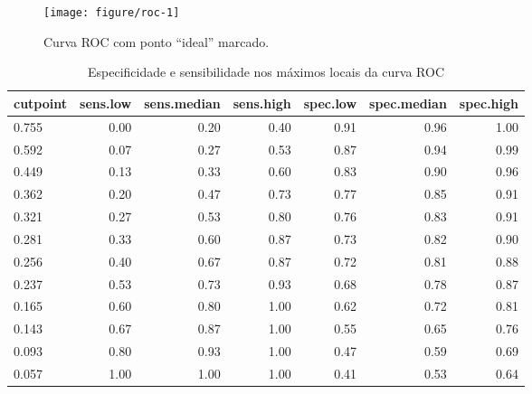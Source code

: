 \documentclass[a4paper,titlepage]{ppgi}\usepackage[]{graphicx}\usepackage[]{color}
\makeatletter
\def\maxwidth{ %
  \ifdim\Gin@nat@width>\linewidth
    \linewidth
  \else
    \Gin@nat@width
  \fi
}
\newenvironment{knitrout}{}{} %
\makeatother
\begin{document}
{\begin{knitrout}
\color{fgcolor}\begin{figure}
\texttt{[image: figure/roc-1]} \caption[Curva ROC com ponto ``ideal'' marcado]{Curva ROC com ponto ``ideal'' marcado.}\label{fig:roc}
\end{figure}


\end{knitrout}

\begin{table}
\centering
\begin{knitrout}
\color{fgcolor}
\begin{tabular}{l|r|r|r|r|r|r}
\hline
cutpoint & sens.low & sens.median & sens.high & spec.low & spec.median & spec.high\\
\hline
0.755 & 0.00 & 0.20 & 0.40 & 0.91 & 0.96 & 1.00\\
\hline
0.592 & 0.07 & 0.27 & 0.53 & 0.87 & 0.94 & 0.99\\
\hline
0.449 & 0.13 & 0.33 & 0.60 & 0.83 & 0.90 & 0.96\\
\hline
0.362 & 0.20 & 0.47 & 0.73 & 0.77 & 0.85 & 0.91\\
\hline
0.321 & 0.27 & 0.53 & 0.80 & 0.76 & 0.83 & 0.91\\
\hline
0.281 & 0.33 & 0.60 & 0.87 & 0.73 & 0.82 & 0.90\\
\hline
0.256 & 0.40 & 0.67 & 0.87 & 0.72 & 0.81 & 0.88\\
\hline
0.237 & 0.53 & 0.73 & 0.93 & 0.68 & 0.78 & 0.87\\
\hline
0.165 & 0.60 & 0.80 & 1.00 & 0.62 & 0.72 & 0.81\\
\hline
0.143 & 0.67 & 0.87 & 1.00 & 0.55 & 0.65 & 0.76\\
\hline
0.093 & 0.80 & 0.93 & 1.00 & 0.47 & 0.59 & 0.69\\
\hline
0.057 & 1.00 & 1.00 & 1.00 & 0.41 & 0.53 & 0.64\\
\hline
\end{tabular}


\end{knitrout}
\caption{Especificidade e sensibilidade nos máximos locais da curva ROC}
\label{table:roc}
\end{table}

%
%
%
\end{document}
